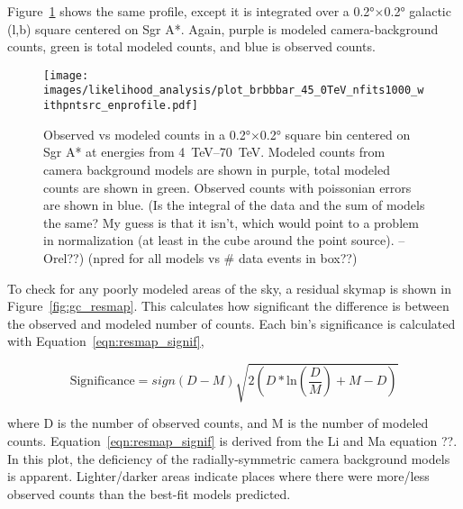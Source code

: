   Figure~\ref{fig:gc_profile_energy} shows the same profile, except it is integrated over a \ang{0.2}$\times$\ang{0.2} galactic (l,b) square centered on Sgr A*.
  Again, purple is modeled camera-background counts, green is total modeled counts, and blue is observed counts.
  
  \begin{figure}[h]
    \centering
    \texttt{[image: images/likelihood\_analysis/plot\_brbbbar\_45\_0TeV\_nfits1000\_withpntsrc\_enprofile.pdf]}
    \caption[Galactic Center Profile vs Energy]{
      Observed vs modeled counts in a \ang{0.2}$\times$\ang{0.2} square bin centered on Sgr A* at energies from \SIrange{4}{70}{TeV}.
      Modeled counts from camera background models are shown in purple, total modeled counts are shown in green.
      Observed counts with poissonian errors are shown in blue.
      {\color{red}(Is the integral of the data and the sum of models the same? My guess is that it isn't, which would point to a problem in normalization (at least in the cube around the point source). --Orel??)}
      {\color{red}(npred for all models vs # data events in box??)}
    }
    \label{fig:gc_profile_energy}
  \end{figure}
  
  To check for any poorly modeled areas of the sky, a residual skymap is shown in Figure~\ref{fig:gc_resmap}.
  This calculates how significant the difference is between the observed and modeled number of counts.
  Each bin's significance is calculated with Equation~\ref{eqn:resmap_signif},
  
  \begin{equation}\label{eqn:resmap_signif}
    \text{Significance} = sign(D-M) \sqrt{ 2 \left ( D * \textrm{ln} \left ( \frac{D}{M} \right ) + M - D \right ) }
  \end{equation}
  
  where D is the number of observed counts, and M is the number of modeled counts.
  Equation~\ref{eqn:resmap_signif} is derived from the Li and Ma {\color{red}equation ??}. 
  In this plot, the deficiency of the radially-symmetric camera background models is apparent.
  Lighter/darker areas indicate places where there were more/less observed counts than the best-fit models predicted.
  
